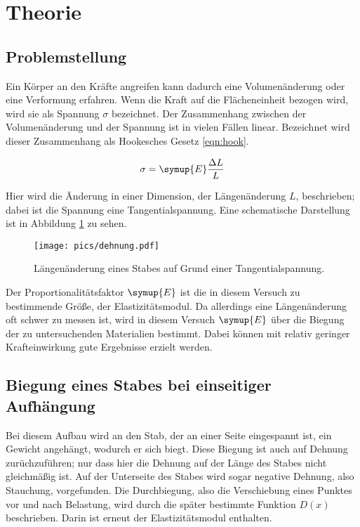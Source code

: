 \section{Theorie}
\label{sec:Theorie}

\subsection{Problemstellung}

Ein Körper an den Kräfte angreifen kann dadurch eine Volumenänderung oder eine
Verformung erfahren. Wenn die Kraft auf die Flächeneinheit bezogen wird, wird sie
als Spannung $\sigma$ bezeichnet. Der Zusammenhang zwischen der Volumenänderung
und der Spannung ist in vielen Fällen linear. Bezeichnet wird dieser Zusammenhang
als Hookesches Gesetz \eqref{eqn:hook}.

\begin{equation}
  \sigma = \symup{E} \frac{\Delta L}{L}
  \label{eqn:hook}
\end{equation}

Hier wird die Änderung in einer Dimension, der Längenänderung $L$, beschrieben;
dabei ist die Spannung eine Tangentialspannung. Eine schematische Darstellung ist
in Abbildung \ref{fig:dehnung} zu sehen.

\begin{figure}[h]
  \centering
  \texttt{[image: pics/dehnung.pdf]}
  \caption{Längenänderung eines Stabes auf Grund einer Tangentialspannung\cite{anleitung}.}
  \label{fig:dehnung}
\end{figure}

Der Proportionalitätsfaktor $\symup{E}$ ist die in diesem Versuch zu bestimmende
Größe, der Elastizitätsmodul.
Da allerdings eine Längenänderung oft schwer zu messen ist, wird in diesem
Versuch $\symup{E}$ über die Biegung der zu untersuchenden Materialien bestimmt.
Dabei können mit relativ geringer Krafteinwirkung gute Ergebnisse erzielt werden.

\subsection{Biegung eines Stabes bei einseitiger Aufhängung}

Bei diesem Aufbau wird an den Stab, der an einer Seite eingespannt ist,
 ein Gewicht angehängt, wodurch er sich
biegt. Diese Biegung ist auch auf Dehnung zurüchzuführen; nur dass hier die
Dehnung auf der Länge des Stabes nicht gleichmäßig ist. Auf der Unterseite des
Stabes wird sogar negative Dehnung, also Stauchung, vorgefunden. Die Durchbiegung,
also die Verschiebung eines Punktes vor und nach Belastung, wird durch die
später bestimmte Funktion $D(x)$ beschrieben. Darin ist erneut der Elastizitätsmodul
enthalten.

